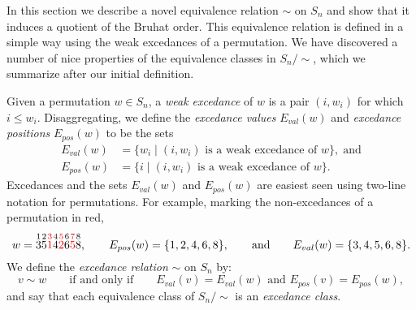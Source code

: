 \documentclass[12pt]{amsart}
\theoremstyle{definition}
\theoremstyle{remark}
\numberwithin{equation}{section}
\newcommand{\QSV}{\mathrm{QSV}}
\newcommand{\EP}{E_{pos}}
\newcommand{\EV}{E_{val}}
\begin{document}
In this section we describe a novel equivalence relation $\sim$ on $S_{n}$ and show that it induces a quotient of the Bruhat order.  
This equivalence relation is defined in a simple way using the weak excedances of a permutation.  
We have discovered a number of nice properties of the equivalence classes in $S_{n}\big/\!\!\sim$, which we summarize after our initial definition.

%
%
%

Given a permutation $w \in S_{n}$, a \emph{weak excedance} of $w$ is a pair $(i, w_{i})$ for which $i \le w_{i}$.  Disaggregating, we define the \emph{excedance values} $\EV(w)$ and \emph{excedance positions} $\EP(w)$ to be the sets
\begin{align*}
\EV(w) &= \{ w_{i} \;|\; \text{$(i, w_{i})$ is a weak excedance of $w$}\},\;\text{and} \\[0.5em]
\EP(w) &= \{ i  \;|\; \text{$(i, w_{i})$ is a weak excedance of $w$}\}.
\end{align*}
Excedances and the sets $\EV(w)$ and $\EP(w)$ are easiest seen using two-line notation for permutations.  For example, marking the non-excedances of a permutation in red,
\[
w = \overset{1}{3} \overset{2}{5} {\color{red} \overset{3}{1}} \overset{4}{4} {\color{red} \overset{5}{2}} \overset{6}{6} {\color{red} \overset{7}{5}} \overset{8}{8},
\qquad
\EP(w) = \{1, 2, 4, 6, 8\},\qquad\text{and}\qquad
\EV(w) = \{3, 4, 5, 6, 8\}.
\]
We define the \emph{excedance relation} $\sim$ on $S_{n}$ by:
\begin{equation}
\label{eq:excednacerel}
v \sim w \qquad\text{if and only if} \qquad \text{$\EV(v) = \EV(w)$ and $\EP(v) = \EP(w)$},
\end{equation}
and say that each equivalence class of $S_{n}\big/\!\!\sim$ is an \emph{excedance class}.
\end{document}
